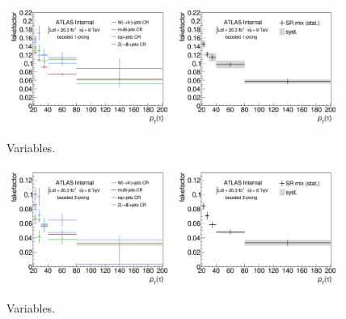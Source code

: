 \begin{figure}[tp]
  \centering
  \includegraphics[width=0.48\textwidth]{figures/backgrounds/fakefactor_8TeV_boosted_1p_CRs}
  \includegraphics[width=0.48\textwidth]{figures/backgrounds/fakefactor_8TeV_boosted_1p_mix}
  \caption{Variables.}
  \label{fig:backgrounds-fakefactorsboost1p}
\end{figure}

\begin{figure}[tp]
  \centering
  \includegraphics[width=0.48\textwidth]{figures/backgrounds/fakefactor_8TeV_boosted_3p_CRs}
  \includegraphics[width=0.48\textwidth]{figures/backgrounds/fakefactor_8TeV_boosted_3p_mix}
  \caption{Variables.}
  \label{fig:backgrounds-fakefactorsboost3p}
\end{figure}

